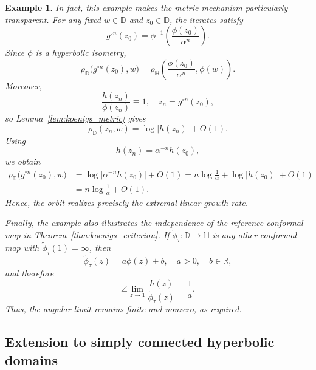 \documentclass[10pt,a4paper]{amsart}
\numberwithin{equation}{section}
\newtheorem{example}[equation]{Example}
\begin{document}
\begin{example}
In fact, this example makes the metric mechanism particularly
transparent. For any fixed $w\in\mathbb{D}$ and $z_0\in\mathbb{D}$,
the iterates satisfy
\begin{equation*}
g^{\circ n}(z_0)
=
\phi^{-1}\!\left(\frac{\phi(z_0)}{\alpha^n}\right).
\end{equation*}
Since $\phi$ is a hyperbolic isometry,
\begin{equation*}
\rho_{\mathbb{D}}
\bigl(g^{\circ n}(z_0),w\bigr)
=
\rho_{\mathbb{H}}
\left(
\frac{\phi(z_0)}{\alpha^n},
\phi(w)
\right).
\end{equation*}
Moreover,
\begin{equation*}
\frac{h(z_n)}{\phi(z_n)}\equiv1,
\quad
z_n=g^{\circ n}(z_0),
\end{equation*}
so Lemma~\ref{lem:koenigs_metric} gives
\begin{equation*}
\rho_{\mathbb{D}}(z_n,w)
=
\log|h(z_n)|+O(1).
\end{equation*}
Using
\begin{equation*}
h(z_n)=\alpha^{-n}h(z_0),
\end{equation*}
we obtain
\begin{align*}
\rho_{\mathbb{D}}
\bigl(g^{\circ n}(z_0),w\bigr)
&=
\log\left|\alpha^{-n}h(z_0)\right|+O(1)
=
n\log\frac1\alpha+\log|h(z_0)|+O(1)\\
&=
n\log\frac1\alpha+O(1).
\end{align*}
Hence, the orbit realizes precisely the extremal linear growth rate.

Finally, the example also illustrates the independence of the
reference conformal map in Theorem~\ref{thm:koenigs_criterion}. If
$\widetilde{\phi}_\tau:\mathbb{D}\to\mathbb{H}$ is any other conformal
map with $\widetilde{\phi}_\tau(1)=\infty$, then
\begin{equation*}
\widetilde{\phi}_\tau(z)=a\phi(z)+b,
\quad a>0,\quad b\in\mathbb{R},
\end{equation*}
and therefore
\begin{equation*}
\angle\lim_{z\to1}
\frac{h(z)}{\widetilde{\phi}_\tau(z)}
=
\frac1a.
\end{equation*}
Thus, the angular limit remains finite and nonzero, as required.
\end{example}


\subsection{Extension to simply connected hyperbolic domains}
\label{subsec:simply_connected}
\end{document}
